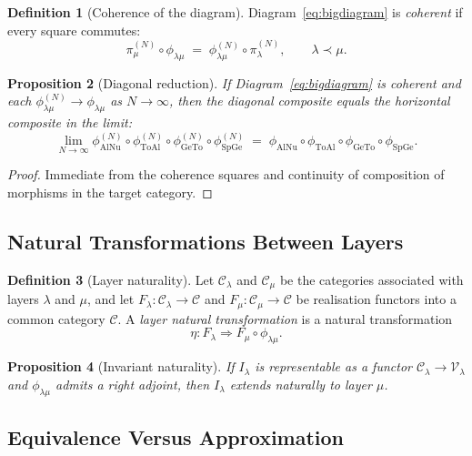 \documentclass[11pt,a4paper]{article}
\theoremstyle{definition}
\newtheorem{definition}{Definition}[section]
\theoremstyle{plain}
\newtheorem{proposition}[definition]{Proposition}
\newcommand{\Sp}{\mathrm{Sp}}
\newcommand{\Ge}{\mathrm{Ge}}
\newcommand{\To}{\mathrm{To}}
\newcommand{\Al}{\mathrm{Al}}
\newcommand{\Nu}{\mathrm{Nu}}
\newcommand{\philam}{\phi_{\lambda\mu}}
\begin{document}
\begin{definition}[Coherence of the diagram]
Diagram~\eqref{eq:bigdiagram} is \emph{coherent} if every square
commutes:
\[
  \pi^{(N)}_\mu \circ \philam
  \;=\;
  \phi^{(N)}_{\lambda\mu} \circ \pi^{(N)}_\lambda ,
  \qquad \lambda \prec \mu .
\]
\end{definition}

\begin{proposition}[Diagonal reduction]\label{prop:diag}
If Diagram~\eqref{eq:bigdiagram} is coherent and each
$\phi^{(N)}_{\lambda\mu} \to \philam$ as $N \to \infty$, then the
diagonal composite equals the horizontal composite in the limit:
\[
  \lim_{N \to \infty}
  \phi^{(N)}_{\Al\Nu} \circ \phi^{(N)}_{\To\Al} \circ \phi^{(N)}_{\Ge\To} \circ \phi^{(N)}_{\Sp\Ge}
  \;=\;
  \phi_{\Al\Nu} \circ \phi_{\To\Al} \circ \phi_{\Ge\To} \circ \phi_{\Sp\Ge} .
\]
\end{proposition}

\begin{proof}
Immediate from the coherence squares and continuity of composition
of morphisms in the target category.
\end{proof}

\subsection{Natural Transformations Between Layers}

\begin{definition}[Layer naturality]
Let $\mathcal{C}_\lambda$ and $\mathcal{C}_\mu$ be the categories
associated with layers $\lambda$ and $\mu$, and let
$F_\lambda : \mathcal{C}_\lambda \to \mathcal{C}$ and
$F_\mu : \mathcal{C}_\mu \to \mathcal{C}$ be realisation functors
into a common category $\mathcal{C}$. A \emph{layer natural
transformation} is a natural transformation
\[
  \eta : F_\lambda \Longrightarrow F_\mu \circ \philam .
\]
\end{definition}

\begin{proposition}[Invariant naturality]
If $I_\lambda$ is representable as a functor
$\mathcal{C}_\lambda \to \mathcal{V}_\lambda$ and $\philam$ admits a
right adjoint, then $I_\lambda$ extends naturally to layer $\mu$.
\end{proposition}

\subsection{Equivalence Versus Approximation}
\end{document}
